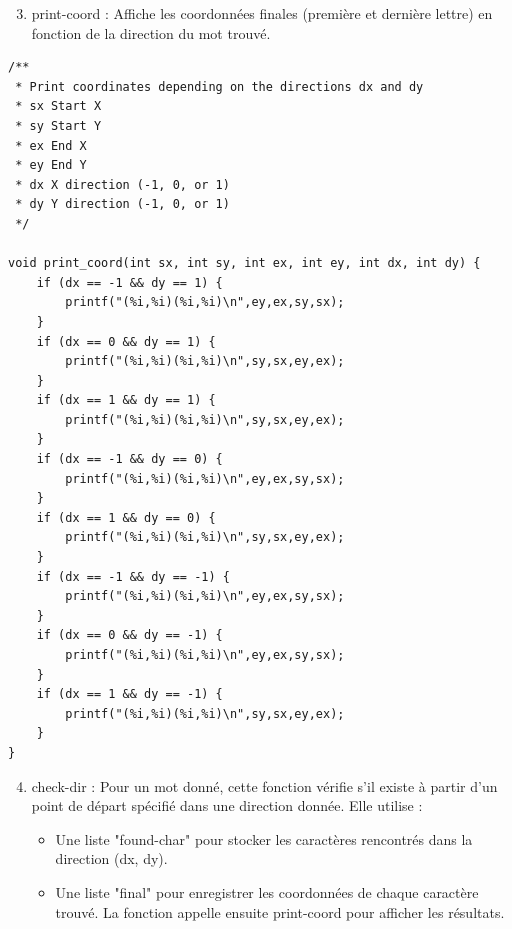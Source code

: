 \begin{enumerate}[resume]
  \setcounter{enumi}{2}
  \item print-coord : Affiche les coordonnées finales (première et dernière lettre) en fonction de la direction du mot trouvé.
\end{enumerate}

\begin{lstlisting}[style=CStyle]
/**
 * Print coordinates depending on the directions dx and dy
 * sx Start X
 * sy Start Y
 * ex End X
 * ey End Y
 * dx X direction (-1, 0, or 1)
 * dy Y direction (-1, 0, or 1)
 */
 
void print_coord(int sx, int sy, int ex, int ey, int dx, int dy) {
	if (dx == -1 && dy == 1) {
		printf("(%i,%i)(%i,%i)\n",ey,ex,sy,sx);
	}
	if (dx == 0 && dy == 1) {
		printf("(%i,%i)(%i,%i)\n",sy,sx,ey,ex);
	}
	if (dx == 1 && dy == 1) {
		printf("(%i,%i)(%i,%i)\n",sy,sx,ey,ex);
	}
	if (dx == -1 && dy == 0) {
		printf("(%i,%i)(%i,%i)\n",ey,ex,sy,sx);
	}
	if (dx == 1 && dy == 0) {
		printf("(%i,%i)(%i,%i)\n",sy,sx,ey,ex);
	}
	if (dx == -1 && dy == -1) {
		printf("(%i,%i)(%i,%i)\n",ey,ex,sy,sx);
	}
	if (dx == 0 && dy == -1) {
		printf("(%i,%i)(%i,%i)\n",ey,ex,sy,sx);
	}
	if (dx == 1 && dy == -1) {
		printf("(%i,%i)(%i,%i)\n",sy,sx,ey,ex);
	}
}
\end{lstlisting}

\begin{enumerate}[resume]
  \setcounter{enumi}{3}
  \item check-dir : Pour un mot donné, cette fonction vérifie s'il existe à partir d'un point de départ spécifié dans une direction donnée. Elle utilise :
    \begin{itemize}
      \item{Une liste "found-char" pour stocker les caractères rencontrés dans la direction (dx, dy).}
      \item{Une liste "final" pour enregistrer les coordonnées de chaque caractère trouvé. La fonction appelle ensuite print-coord pour afficher les résultats.}
    \end{itemize}
\end{enumerate}

